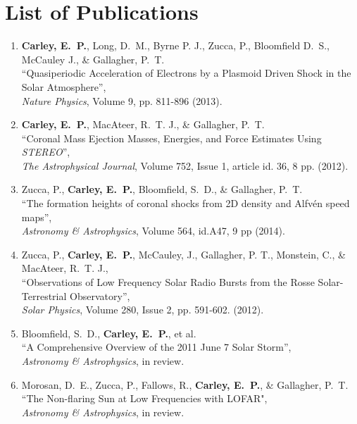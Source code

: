 \chapter*{List of Publications}
\label{chapter:publications}


\begin{enumerate}

\item \textbf{Carley, E.~P.}, Long, D.~M., Byrne P. J., Zucca, P., Bloomfield D.~S., McCauley J., \& Gallagher, P.~T.\\
``Quasiperiodic Acceleration of Electrons by a Plasmoid Driven Shock in the Solar Atmosphere'', \\
\emph{Nature Physics}, Volume 9, pp. 811-896 (2013).

\item \textbf{Carley, E.~P.}, MacAteer, R.~T. J., \& Gallagher, P.~T.\\
``Coronal Mass Ejection Masses, Energies, and Force Estimates Using \emph{STEREO}'', \\
\emph{The Astrophysical Journal}, Volume 752, Issue 1, article id. 36, 8 pp. (2012).

\item Zucca, P., \textbf{Carley, E.~P.}, Bloomfield, S.~D., \& Gallagher, P.~T.\\
``The formation heights of coronal shocks from 2D density and Alfv\'{e}n speed maps'', \\
\emph{Astronomy \& Astrophysics}, Volume 564, id.A47, 9 pp (2014).

\item Zucca, P., \textbf{Carley, E.~P.},  McCauley, J., Gallagher, P. T., Monstein, C., \& MacAteer, R.~T. J.,\\
``Observations of Low Frequency Solar Radio Bursts from the Rosse Solar-Terrestrial Observatory'', \\
\emph{Solar Physics}, Volume 280, Issue 2, pp. 591-602. (2012).

\item Bloomfield, S.~D., \textbf{Carley, E.~P.}, et al.\\
``A Comprehensive Overview of the 2011 June 7 Solar Storm'', \\
\emph{Astronomy \& Astrophysics}, in review.

\item Morosan, D.~E., Zucca, P., Fallows, R., \textbf{Carley, E.~P.}, \& Gallagher, P.~T.
``The Non-flaring Sun at Low Frequencies with LOFAR", \\
\emph{Astronomy \& Astrophysics}, in review.


\end{enumerate}
